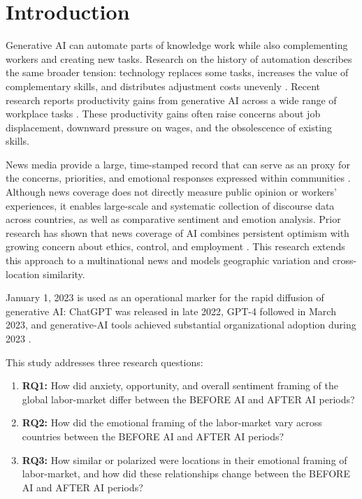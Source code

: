 \documentclass[conference]{IEEEtran}
\begin{document}
\section{Introduction}

Generative AI can automate parts of knowledge work while also complementing
workers and creating new tasks. Research on the history of automation describes 
the same broader tension: technology replaces some tasks, 
increases the value of complementary skills, 
and distributes adjustment costs unevenly \cite{autor2015jobs, acemoglu2020robots}.
Recent research reports productivity gains from generative AI 
across a wide range of workplace tasks \cite{noy2023experimental,brynjolfsson2025generative}.
These productivity gains often raise concerns about job displacement, 
downward pressure on wages, and the obsolescence of existing skills.


News media provide a large, time-stamped record that can serve as an
proxy for the concerns, priorities, and emotional responses expressed within communities \cite{ploger2025relationships}. 
Although news coverage does not directly measure public opinion or workers’ experiences, 
it enables large-scale and systematic collection of discourse data across countries, 
as well as comparative sentiment and emotion analysis. 
Prior research has shown that news coverage of AI combines persistent optimism 
with growing concern about ethics, control, and employment \cite{fast2017long}. 
This research extends this approach to a multinational news and 
models geographic variation and cross-location similarity.

January 1, 2023 is used as an operational marker for the rapid diffusion of generative AI: 
ChatGPT was released in late 2022, GPT-4 followed in March 2023, 
and generative-AI tools achieved substantial organizational adoption during 2023 
\cite{openai2022chatgpt,openai2023gpt4,mckinsey2023genai}.



This study addresses three research questions:
\begin{enumerate}
\item \textbf{RQ1:} How did anxiety, opportunity, and overall sentiment framing of the
global labor-market differ between the BEFORE AI and AFTER AI periods?

\item \textbf{RQ2:} How did the emotional framing of the labor-market vary
across countries between the BEFORE AI and AFTER AI periods?

\item \textbf{RQ3:} How similar or polarized were locations in their
emotional framing of labor-market, and how did these relationships
change between the BEFORE AI and AFTER AI periods?

\end{enumerate}
\end{document}
